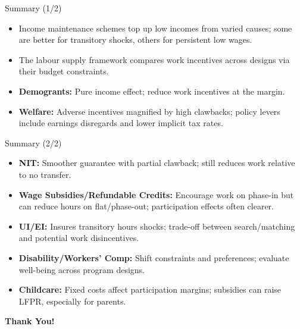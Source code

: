 \documentclass[aspectratio=169]{beamer}
\begin{document}
\begin{frame}{Summary (1/2)}
\transfade
\begin{itemize}
  \item Income maintenance schemes top up low incomes from varied causes; some are better for transitory shocks, others for persistent low wages.
  \item The labour supply framework compares work incentives across designs via their budget constraints.
  \item \textbf{Demogrants:} Pure income effect; reduce work incentives at the margin.
  \item \textbf{Welfare:} Adverse incentives magnified by high clawbacks; policy levers include earnings disregards and lower implicit tax rates.
\end{itemize}
\end{frame}

\begin{frame}{Summary (2/2)}
\transfade
\begin{itemize}
  \item \textbf{NIT:} Smoother guarantee with partial clawback; still reduces work relative to no transfer.
  \item \textbf{Wage Subsidies/Refundable Credits:} Encourage work on phase-in but can reduce hours on flat/phase-out; participation effects often clearer.
  \item \textbf{UI/EI:} Insures transitory hours shocks; trade-off between search/matching and potential work disincentives.
  \item \textbf{Disability/Workers’ Comp:} Shift constraints and preferences; evaluate well-being across program designs.
  \item \textbf{Childcare:} Fixed costs affect participation margins; subsidies can raise LFPR, especially for parents.
\end{itemize}
\end{frame}

\begin{frame}
\centering
\Huge{\textbf{Thank You!}} \\

\end{frame}
\end{document}
